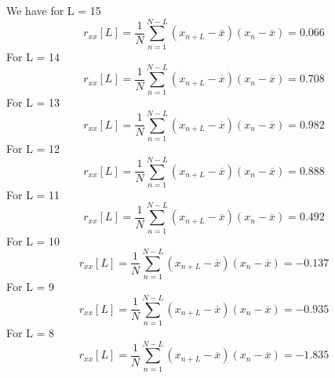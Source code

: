\documentclass{article}
\begin{document}
 
 We have for L = 15
 \begin{equation}
      r_{xx}[L] = \frac{1}{N}\sum_{n=1}^{N - L} (x_{n+L} - \overline{x})(x_{n} - \overline{x}) = 0.066
 \end{equation}
 For L = 14
 \begin{equation}
      r_{xx}[L] = \frac{1}{N}\sum_{n=1}^{N - L} (x_{n+L} - \overline{x})(x_{n} - \overline{x}) = 0.708
 \end{equation}
 For L = 13
 \begin{equation}
      r_{xx}[L] = \frac{1}{N}\sum_{n=1}^{N - L} (x_{n+L} - \overline{x})(x_{n} - \overline{x}) = 0.982
 \end{equation}
  For L = 12
 \begin{equation}
      r_{xx}[L] = \frac{1}{N}\sum_{n=1}^{N - L} (x_{n+L} - \overline{x})(x_{n} - \overline{x}) =  0.888
 \end{equation}
  For L = 11
 \begin{equation}
      r_{xx}[L] = \frac{1}{N}\sum_{n=1}^{N - L} (x_{n+L} - \overline{x})(x_{n} - \overline{x}) = 0.492
 \end{equation}
 For L = 10
  \begin{equation}
      r_{xx}[L] = \frac{1}{N}\sum_{n=1}^{N - L} (x_{n+L} - \overline{x})(x_{n} - \overline{x}) = -0.137
 \end{equation}
  For L = 9
  \begin{equation}
      r_{xx}[L] = \frac{1}{N}\sum_{n=1}^{N - L} (x_{n+L} - \overline{x})(x_{n} - \overline{x}) = -0.935
 \end{equation}
  For L = 8
  \begin{equation}
      r_{xx}[L] = \frac{1}{N}\sum_{n=1}^{N - L} (x_{n+L} - \overline{x})(x_{n} - \overline{x}) = -1.835
 \end{equation}
\end{document}
